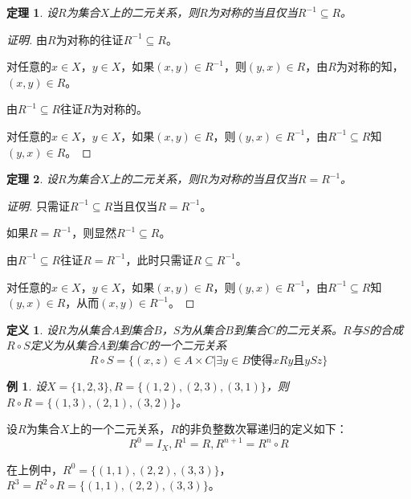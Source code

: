 \documentclass{article}
\newtheorem{Def}{定义}
\newtheorem{Thm}{定理}
\newtheorem{Example}{例}
\begin{document}
\begin{CJK*}{UTF8}{gbsn}
  \begin{Thm}
    设$R$为集合$X$上的二元关系，则$R$为对称的当且仅当$R^{-1}\subseteq R$。
  \end{Thm} 
\begin{proof}[证明]
由$R$为对称的往证$R^{-1}\subseteq R$。

对任意的$x\in X$，$y\in X$，如果$(x,y)\in R^{-1}$，则$(y,x)\in R$，由$R$为对称的知，$(x,y)\in R$。

由$R^{-1}\subseteq R$往证$R$为对称的。

对任意的$x\in X$，$y\in X$，如果$(x,y)\in R$，则$(y,x)\in R^{-1}$，由$R^{-1}\subseteq R$知$(y,x)\in R$。

\end{proof}
  \begin{Thm}
    设$R$为集合$X$上的二元关系，则$R$为对称的当且仅当$R=R^{-1}$。
  \end{Thm}  
  \begin{proof}[证明]
    只需证$R^{-1}\subseteq R$当且仅当$R=R^{-1}$。

    如果$R=R^{-1}$，则显然$R^{-1}\subseteq R$。

    由$R^{-1}\subseteq R$往证$R=R^{-1}$，此时只需证$R\subseteq R^{-1}$。

    对任意的$x\in X$，$y\in X$，如果$(x,y)\in R$，则$(y,x)\in R^{-1}$，由$R^{-1}\subseteq R$知$(y,x)\in R$，从而$(x,y)\in R^{-1}$。
  \end{proof}
  

    \begin{Def}
    设$R$为从集合$A$到集合$B$，$S$为从集合$B$到集合$C$的二元关系。$R$与$S$的合成
    $R\circ S$定义为从集合$A$到集合$C$的一个二元关系
    \[R\circ S = \{(x,z)\in A \times C |  \exists y \in B \text{使得} xRy \text{且} ySz\}\]
  \end{Def}

  \begin{Example}
    设$X=\{1,2,3\}, R=\{(1,2),(2,3),(3,1)\}$，则$R\circ R=\{(1,3),(2,1),(3,2)\}$。
  \end{Example}
  

  设$R$为集合$X$上的一个二元关系，$R$的非负整数次幂递归的定义如下：
  \[R^0=I_X,R^1=R,R^{n+1}=R^{n}\circ R\]

  在上例中，$R^0=\{(1,1),(2,2),(3,3)\}$，$R^3=R^2\circ R=\{(1,1),(2,2),(3,3)\}$。



\end{CJK*}
\end{document}
